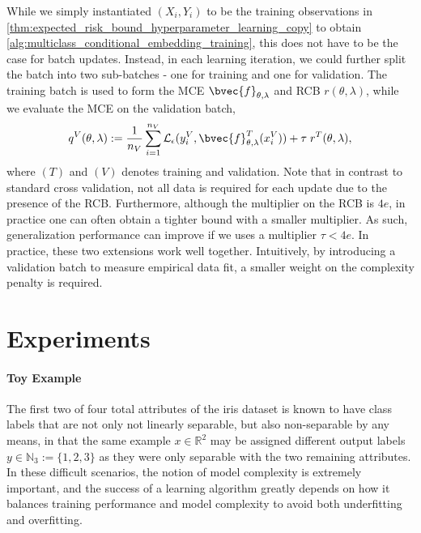 \documentclass[twoside]{article}
\begin{document}
		While we simply instantiated $(X_{i}, Y_{i})$ to be the training observations in \cref{thm:expected_risk_bound_hyperparameter_learning_copy} to obtain \cref{alg:multiclass_conditional_embedding_training}, this does not have to be the case for batch updates. Instead, in each learning iteration, we could further split the batch into two sub-batches - one for training and one for validation. The training batch is used to form the \gls{MCE} $\bvec{f}_{\theta, \lambda}$ and \gls{RCB} $r(\theta, \lambda)$, while we evaluate the \gls{MCE} on the validation batch,
		\begin{equation}
		q^{V}(\theta, \lambda) := \frac{1}{n_{V}} \sum_{i = 1}^{n_{V}} \mathcal{L}_{\epsilon}(y^{V}_{i}, \bvec{f}^{T}_{\theta, \lambda}(x^{V}_{i})) + \tau \; r^{T}(\theta, \lambda),
		\label{eq:validation_learning_objective}
		\end{equation}
		where $(T)$ and $(V)$ denotes training and validation. Note that in contrast to standard cross validation, not all data is required for each update due to the presence of the \gls{RCB}. Furthermore, although the multiplier on the \gls{RCB} is $4 e$, in practice one can often obtain a tighter bound with a smaller multiplier. As such, generalization performance can improve if we uses a multiplier $\tau < 4 e$. In practice, these two extensions work well together. Intuitively, by introducing a validation batch to measure empirical data fit, a smaller weight on the complexity penalty is required. 

	\section{Experiments}
	\label{sec:experiments}
	
	\paragraph{Toy Example}
		
		The first two of four total attributes of the iris dataset \citep{fisher1936use} is known to have class labels that are not only not linearly separable, but also non-separable by any means, in that the same example $x \in \mathbb{R}^{2}$ may be assigned different output labels $y \in \mathbb{N}_{3} := \{1, 2, 3\}$ as they were only separable with the two remaining attributes. In these difficult scenarios, the notion of model complexity is extremely important, and the success of a learning algorithm greatly depends on how it balances training performance and model complexity to avoid both underfitting and overfitting. 
		
\end{document}
